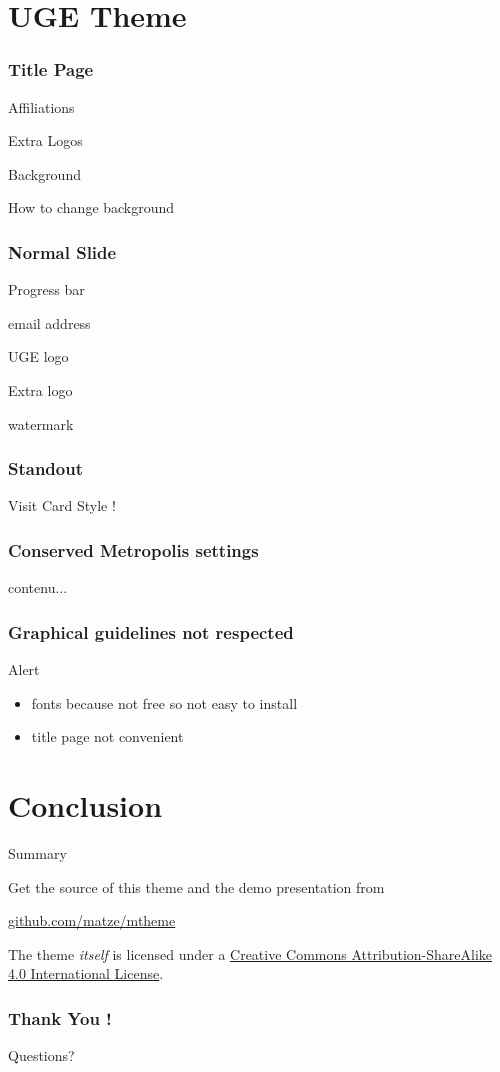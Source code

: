 	\section{UGE Theme}
	
		\begin{frame}
			\frametitle{Title Page}
			
			Affiliations
			
			Extra Logos
			
			Background
			
			How to change background
		\end{frame}
		
		\begin{frame}
			\frametitle{Normal Slide}
			
			Progress bar
			
			email address
			
			UGE logo
			
			Extra logo
			
			watermark
		\end{frame}
				
		\begin{frame}
			\frametitle{Standout}
			
			Visit Card Style !
		\end{frame}
		
		\begin{frame}
			\frametitle{Conserved Metropolis settings}
			
			contenu...
		\end{frame}
		
		\begin{frame}
			\frametitle{Graphical guidelines not respected}
			
			\begin{alertblock}{Alert}
				\begin{itemize}
				 \item fonts because not free so not easy to install
				 \item title page not convenient
				\end{itemize}
	     \end{alertblock}
		\end{frame}
	
	\section{Conclusion}
	
		\begin{frame}{Summary}
		
		  Get the source of this theme and the demo presentation from
		
		  \begin{center}\url{github.com/matze/mtheme}\end{center}
		
		  The theme \emph{itself} is licensed under a
		  \href{http://creativecommons.org/licenses/by-sa/4.0/}{Creative Commons
		  Attribution-ShareAlike 4.0 International License}.
		
		  \begin{center}\ccbysa\end{center}
		\end{frame}
		
		\begin{frame}[standout]
			\frametitle{Thank You !}
		  	
		  	Questions?
		\end{frame}
	